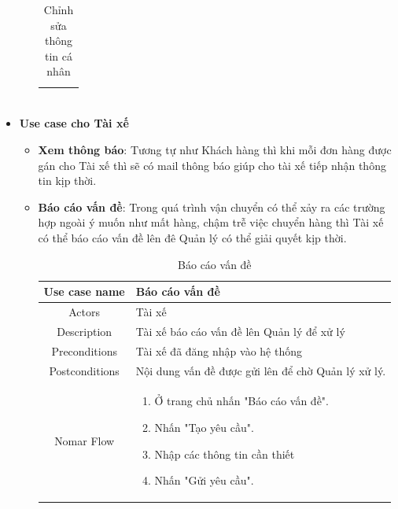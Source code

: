 \begin{itemize}
\begin{itemize}
\begin{table}[!htp]
\begin{tabular}{|c|m{25em}|}
\begin{enumerate}
						\end{enumerate}
						\\
						\hline
					\end{tabular}
					\caption{Chỉnh sửa thông tin cá nhân}
				\end{table}
			
				\newpage
			
		\end{itemize}
	
	
	\item \textbf{Use case cho Tài xế}
	
	\begin{itemize}
		\item \textbf{Xem thông báo}: Tương tự như Khách hàng thì khi mỗi đơn hàng được gán cho Tài xế thì sẽ có mail thông báo giúp cho tài xế tiếp nhận thông tin kịp thời.
		
		\item \textbf{Báo cáo vấn đề}: Trong quá trình vận chuyển có thể xảy ra các trường hợp ngoài ý muốn như mất hàng, chậm trễ việc chuyển hàng thì Tài xế có thể báo cáo vấn đề lên đê Quản lý có thể giải quyết kịp thời.
		
		\begin{table}[!htp]
			\centering\begin{tabular}{|c|m{25em}|}
				\hline 
				Use case name & Báo cáo vấn đề\\ 
				\hline 
				Actors & Tài xế \\ 
				\hline
				Description & Tài xế báo cáo vấn đề lên Quản lý để xử lý \\
				\hline 
				Preconditions & Tài xế đã đăng nhập vào hệ thống \\
				\hline
				Postconditions & Nội dung vấn đề được gửi lên để chờ Quản lý xử lý. \\
				\hline
				Nomar Flow & \begin{enumerate}
					\item Ở trang chủ nhấn "Báo cáo vấn đề".
					\item Nhấn "Tạo yêu cầu".
					\item Nhập các thông tin cần thiết
					\item Nhấn "Gửi yêu cầu".
					
				\end{enumerate}
				\\
				\hline
			\end{tabular}
			\caption{Báo cáo vấn đề}
		\end{table}
	

\end{itemize}
\end{itemize}

